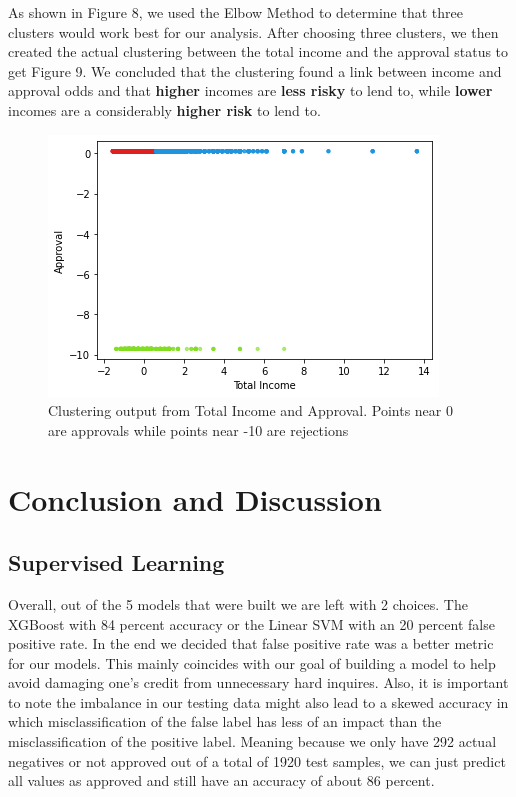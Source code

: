 \documentclass[12pt]{article}
\begin{document}
\noindent As shown in Figure 8, we used the Elbow Method to determine that three clusters would work best for our analysis. After choosing three clusters, we then created the actual clustering between the total income and the approval status to get Figure 9. We concluded that the clustering found a link between income and approval odds and that \textbf{higher} incomes are \textbf{less risky} to lend to, while \textbf{lower} incomes are a considerably \textbf{higher risk} to lend to. \\

\begin{figure}[H]
    \centering
        \includegraphics[scale = 1.0]{figures/output11.png}
        \caption{Clustering output from Total Income and Approval. Points near 0 are approvals while points near -10 are rejections}
\end{figure}

\section{Conclusion and Discussion}
\subsection{Supervised Learning}
Overall, out of the 5 models that were built we are left with 2 choices. The XGBoost with 84 percent accuracy or the Linear SVM with an 20 percent false positive rate. In the end we decided that false positive rate was a better metric for our models. This mainly coincides with our goal of building a model to help avoid damaging one's credit from unnecessary hard inquires. Also, it is important to note the imbalance in our testing data might also lead to a skewed accuracy in which misclassification of the false label has less of an impact than the misclassification of the positive label. Meaning because we only have 292 actual negatives or not approved out of a total of 1920 test samples, we can just predict all values as approved and still have an accuracy of about 86 percent.
\end{document}

